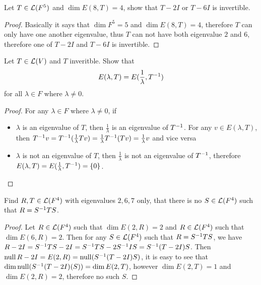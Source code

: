 \documentclass[../main.tex]{subfiles}
\begin{document}
\begin{exercise}
  Let $T \in \mathcal{L}(F^5)$ and $\dim E(8, T) = 4$, show that $T - 2I$ or $T - 6I$ is invertible.
\end{exercise}
\begin{proof}
  Basically it says that $\dim F^5 = 5$ and $\dim E(8, T) = 4$, therefore $T$
  can only have one another eigenvalue, thus $T$ can not have both eigenvalue $2$ and $6$,
  therefore one of $T - 2I$ and $T - 6I$ is invertible.
\end{proof}

\begin{exercise}
  Let $T \in \mathcal{L}(V)$ and $T$ inveritble. Show that
  \[
  E(\lambda, T) = E(\frac{1}{\lambda}, T^{-1})
  \]
  for all $\lambda \in F$ where $\lambda \neq 0$.
\end{exercise}
\begin{proof}
  For any $\lambda \in F$ where $\lambda \neq 0$, if
  \begin{itemize}
    \item $\lambda$ is an eigenvalue of $T$, then $\frac{1}{\lambda}$ is an eigenvalue of $T^{-1}$.
          For any $v \in E(\lambda, T)$, then $T^{-1}v = T^{-1}(\frac{1}{\lambda}Tv) = \frac{1}{\lambda}T^{-1}(Tv) = \frac{1}{\lambda}v$
          and vice versa
    \item $\lambda$ is not an eigenvalue of $T$, then $\frac{1}{\lambda}$ is not an eigenvalue of $T^{-1}$,
          therefore $E(\lambda, T) = E(\frac{1}{\lambda}, T^{-1}) = \{0\}$.
  \end{itemize}
\end{proof}

\setcounter{exercise}{9}
\begin{exercise}
  Find $R, T \in \mathcal{L}(F^4)$ with eigenvalues $2, 6, 7$ only, that
  there is no $S \in \mathcal{L}(F^4)$ such that $R = S^{-1}TS$.
\end{exercise}
\begin{proof}
  Let $R \in \mathcal{L}(F^4)$ such that $\dim E(2, R) = 2$ and $R \in \mathcal{L}(F^4)$ such that $\dim E(6, R) = 2$.
  Then for any $S \in \mathcal{L}(F^4)$ such that $R = S^{-1}TS$, we have
  $R - 2 I = S^{-1}TS - 2I = S^{-1}TS - 2S^{-1}IS = S^{-1}(T - 2I)S$.
  Then $\operatorname{null} R - 2I = E(2, R) = \operatorname{null} (S^{-1}(T - 2I)S)$, it is easy
  to see that $\dim \operatorname{null} (S^{-1}(T - 2I)(S)) = \dim E(2, T)$,
  however $\dim E(2, T) = 1$ and $\dim E(2, R) = 2$, therefore no such $S$.
\end{proof}
\end{document}
